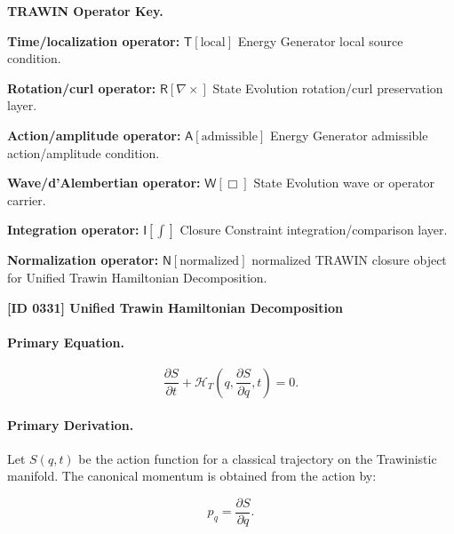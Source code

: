 \par\vspace{0.45\baselineskip}
\noindent\begin{minipage}[t]{\linewidth}
\begingroup
\small
\raggedright
\textbf{TRAWIN Operator Key.}\par
\noindent\textbf{Time/localization operator:} $\mathsf{T}\!\left[\mathrm{local}\right]$ Energy Generator local source condition.\par
\noindent\textbf{Rotation/curl operator:} $\mathsf{R}\!\left[\nabla\times\right]$ State Evolution rotation/curl preservation layer.\par
\noindent\textbf{Action/amplitude operator:} $\mathsf{A}\!\left[\mathrm{admissible}\right]$ Energy Generator admissible action/amplitude condition.\par
\noindent\textbf{Wave/d'Alembertian operator:} $\mathsf{W}\!\left[\Box\right]$ State Evolution wave or operator carrier.\par
\noindent\textbf{Integration operator:} $\mathsf{I}\!\left[\int\right]$ Closure Constraint integration/comparison layer.\par
\noindent\textbf{Normalization operator:} $\mathsf{N}\!\left[\mathrm{normalized}\right]$ normalized TRAWIN closure object for Unified Trawin Hamiltonian Decomposition.\par
\endgroup
\end{minipage}

\clearpage
\noindent\textbf{[ID 0331] Unified Trawin Hamiltonian Decomposition}\par
\vspace{0.35em}
\paragraph{Primary Equation.}
\begin{equation}
\frac{\partial S}{\partial t}
+
\mathcal{H}_T
\left(
q,\frac{\partial S}{\partial q},t
\right)
=
0 .
\end{equation}

\paragraph{Primary Derivation.}
Let $S(q,t)$ be the action function for a classical trajectory on the Trawinistic manifold.  
The canonical momentum is obtained from the action by:

\begin{equation}
p_q=\frac{\partial S}{\partial q}.
\end{equation}


